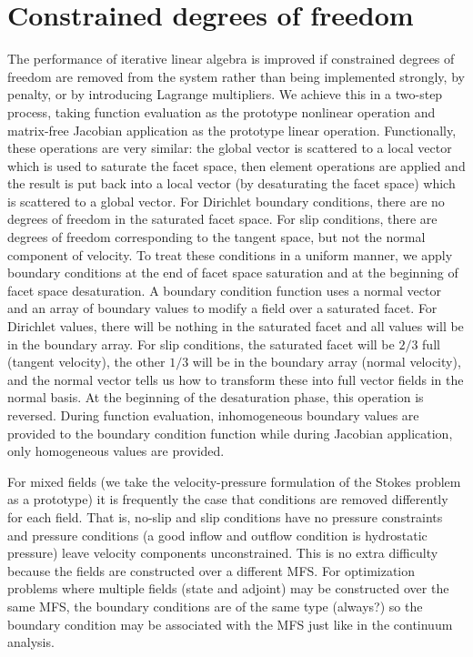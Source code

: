 \documentclass[a4paper]{article}
\begin{document}
\section{Constrained degrees of freedom}
The performance of iterative linear algebra is improved if constrained degrees of freedom are removed from the system
rather than being implemented strongly, by penalty, or by introducing Lagrange multipliers.  We achieve this in a
two-step process, taking function evaluation as the prototype nonlinear operation and matrix-free Jacobian application
as the prototype linear operation.  Functionally, these operations are very similar: the global vector is scattered to a
local vector which is used to saturate the facet space, then element operations are applied and the result is put back
into a local vector (by desaturating the facet space) which is scattered to a global vector.  For Dirichlet boundary
conditions, there are no degrees of freedom in the saturated facet space.  For slip conditions, there are degrees of
freedom corresponding to the tangent space, but not the normal component of velocity.  To treat these conditions in a
uniform manner, we apply boundary conditions at the end of facet space saturation and at the beginning of facet space
desaturation.  A boundary condition function uses a normal vector and an array of boundary values to modify a field over
a saturated facet.  For Dirichlet values, there will be nothing in the saturated facet and all values will be in the
boundary array.  For slip conditions, the saturated facet will be $2/3$ full (tangent velocity), the other $1/3$ will be
in the boundary array (normal velocity), and the normal vector tells us how to transform these into full vector fields
in the normal basis.  At the beginning of the desaturation phase, this operation is reversed.  During function
evaluation, inhomogeneous boundary values are provided to the boundary condition function while during Jacobian
application, only homogeneous values are provided.

For mixed fields (we take the velocity-pressure formulation of the Stokes problem as a prototype) it is frequently the
case that conditions are removed differently for each field.  That is, no-slip and slip conditions have no pressure
constraints and pressure conditions (a good inflow and outflow condition is hydrostatic pressure) leave velocity
components unconstrained.  This is no extra difficulty because the fields are constructed over a different MFS.  For
optimization problems where multiple fields (state and adjoint) may be constructed over the same MFS, the boundary
conditions are of the same type (always?) so the boundary condition may be associated with the MFS just like in the
continuum analysis.
\end{document}
